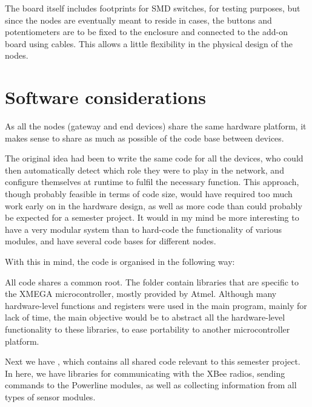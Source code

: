 The board itself includes footprints for SMD switches, for testing purposes, but
since the nodes are eventually meant to reside in cases, the buttons and
potentiometers are to be fixed to the enclosure and connected to the add-on
board using cables. This allows a little flexibility in the physical design of
the nodes.





\section{Software considerations}

As all the nodes (gateway and end devices) share the same hardware platform, it
makes sense to share as much as possible of the code base between devices.

The original idea had been to write the same code for all the devices, who could
then automatically detect which role they were to play in the network, and
configure themselves at runtime to fulfil the necessary function. This approach,
though probably feasible in terms of code size, would have required too much
work early on in the hardware design, as well as more code than could probably
be expected for a semester project. It would in my mind be more interesting to
have a very modular system than to hard-code the functionality of various
modules, and have several code bases for different nodes.

With this in mind, the code is organised in the following way:


All code shares a common root. The folder  contain libraries
that are specific to the XMEGA microcontroller, mostly provided by Atmel.
Although many hardware-level functions and registers were used in the main
program, mainly for lack of time, the main objective would be to abstract all
the hardware-level functionality to these libraries, to ease portability to
another microcontroller platform.

Next we have , which contains all shared code relevant to
this semester project. In here, we have libraries for communicating with the
XBee radios, sending commands to the Powerline modules, as well as collecting
information from all types of sensor modules.

